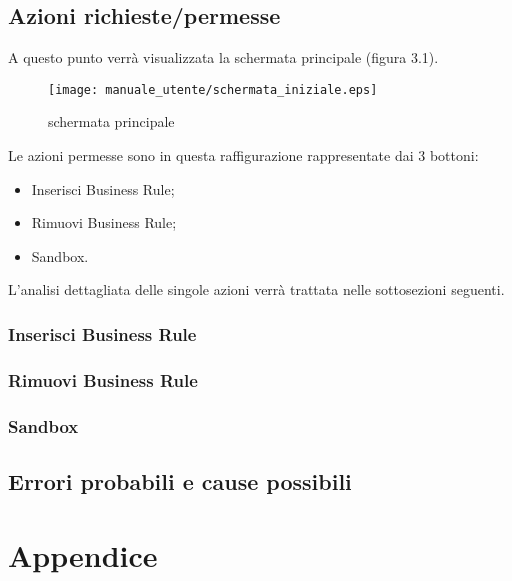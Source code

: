 \section{Azioni richieste/permesse}
A questo punto verr\`a visualizzata la schermata principale (figura 3.1).
\begin{figure}[htbp]
\begin{center}
\texttt{[image: manuale\_utente/schermata\_iniziale.eps]}
\end{center}
\caption{schermata principale}
\label{figura 3.1}
\end{figure}
Le azioni permesse sono in questa raffigurazione rappresentate dai 3 bottoni:
\begin{itemize}
\item Inserisci Business Rule;
\item Rimuovi Business Rule;
\item Sandbox.
\end{itemize}
L'analisi dettagliata delle singole azioni verr\`a trattata nelle sottosezioni seguenti.
\subsection{Inserisci Business Rule}
\subsection{Rimuovi Business Rule}
\subsection{Sandbox}
\section{Errori probabili e cause possibili}
\chapter{Appendice}
